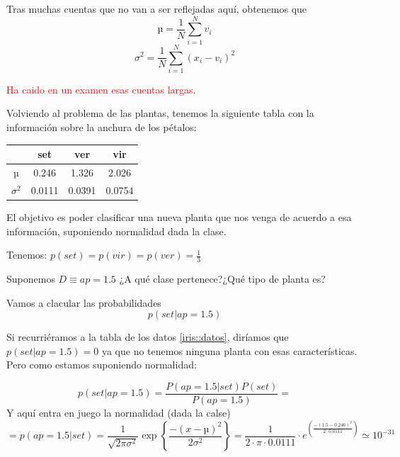 \documentclass{apuntes}
\begin{document}
Tras muchas cuentas que no van a ser reflejadas aquí, obtenemos que 
\[µ = \frac{1}{N}\sum_{i=1}^N v_i\]
\[σ^2 = \frac{1}{N}\sum_{i=1}^N (x_i- v_i)^2\]

 \textcolor{red}{Ha caido en un examen esas cuentas largas}.


Volviendo al problema de las plantas, tenemos la siguiente tabla con la información sobre la anchura de los pétalos:

\begin{center}
\begin{tabular}{c|ccc}
& set & ver & vir \\\hline
µ&0.246&1.326&2.026\\
$σ^2$&0.0111&0.0391&0.0754
\end{tabular}
\end{center}


El objetivo es poder clasificar una nueva planta que nos venga de acuerdo a esa información, suponiendo normalidad dada la clase. 

\begin{example}
Tenemos: $p(set) = p(vir) = p(ver) = \frac{1}{3}$

Suponemos $D\equiv ap=1.5$ ¿A qué clase pertenece?¿Qué tipo de planta es?

Vamos  a clacular las probabilidades \[p(set|ap=1.5)\]

Si recurriéramos a la tabla de los datos \ref{iris::datos}, diríamos que $p(set|ap=1.5)=0$ ya que no tenemos ninguna planta con esas características. Pero como estamos suponiendo normalidad:

\[p(set|ap=1.5) = \frac{P(ap=1.5|set)P(set)}{P(ap=1.5)} = \]
Y aquí entra en juego la normalidad (dada la calse)
\[
= p(ap=1.5|set) = \frac{1}{\sqrt{2πσ^2}}\exp\left\{\frac{-(x-µ)^2}{2σ^2} \right\}= \frac{1}{2·π·0.0111}·e^{\left(\frac{-(1.5-0.246)^2}{2·0.0111}\right)} \simeq 10^{-31}
\]

\end{example}
\end{document}
